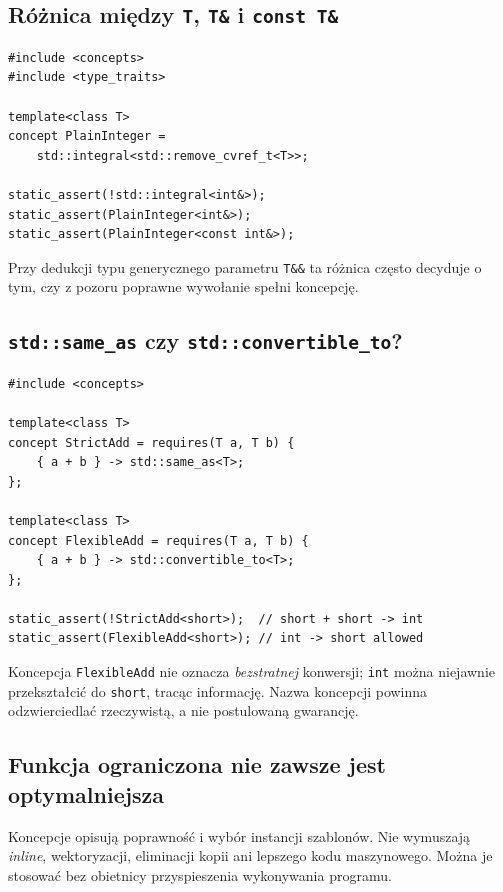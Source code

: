 \subsection{Różnica między \texttt{T}, \texttt{T\&} i \texttt{const T\&}}

\begin{lstlisting}
#include <concepts>
#include <type_traits>

template<class T>
concept PlainInteger =
    std::integral<std::remove_cvref_t<T>>;

static_assert(!std::integral<int&>);
static_assert(PlainInteger<int&>);
static_assert(PlainInteger<const int&>);
\end{lstlisting}

Przy dedukcji typu generycznego parametru
\texttt{T\&\&} ta różnica często decyduje o tym,
czy z pozoru poprawne wywołanie spełni koncepcję.

\subsection{\texttt{std::same\_as} czy \texttt{std::convertible\_to}?}

\begin{lstlisting}
#include <concepts>

template<class T>
concept StrictAdd = requires(T a, T b) {
    { a + b } -> std::same_as<T>;
};

template<class T>
concept FlexibleAdd = requires(T a, T b) {
    { a + b } -> std::convertible_to<T>;
};

static_assert(!StrictAdd<short>);  // short + short -> int
static_assert(FlexibleAdd<short>); // int -> short allowed
\end{lstlisting}

Koncepcja \texttt{FlexibleAdd} nie oznacza \emph{bezstratnej}
konwersji; \texttt{int} można niejawnie przekształcić do
\texttt{short}, tracąc informację. Nazwa koncepcji powinna
odzwierciedlać rzeczywistą, a nie postulowaną gwarancję.

\subsection{Funkcja ograniczona nie zawsze jest optymalniejsza}

Koncepcje opisują poprawność i wybór instancji szablonów.
Nie wymuszają \emph{inline}, wektoryzacji, eliminacji kopii
ani lepszego kodu maszynowego. Można je stosować bez obietnicy
przyspieszenia wykonywania programu.

